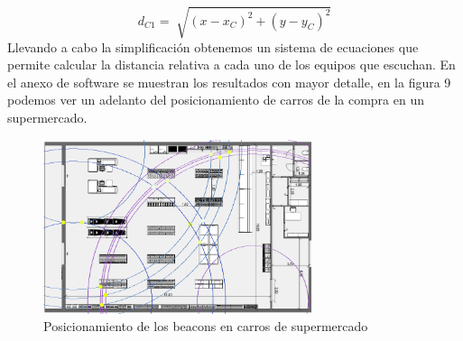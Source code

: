 \documentclass[paper=a4, fontsize=11pt,twoside]{scrartcl}	%
\begin{document}
                \begin{equation}
                    d_{C1}= \sqrt[]{(x-x_C)^2+(y-y_C)^2}
                \end{equation}
                Llevando a cabo la simplificación obtenemos un sistema de ecuaciones que permite calcular la distancia
                relativa a cada uno de los equipos que escuchan. En el anexo de software se muestran los resultados con mayor 
                detalle, en la figura 9 podemos ver un adelanto del posicionamiento de carros de la compra en un supermercado.
                \begin{center}
                    \begin{figure}[h]
                        \centering
                        \includegraphics[width=0.7\textwidth]{agrupation_3.PNG}
                        \caption{Posicionamiento de los beacons en carros de supermercado}
                        \label{fig:mesh7}
                    \end{figure}
                \end{center}
                \paragraph{}
\end{document}
